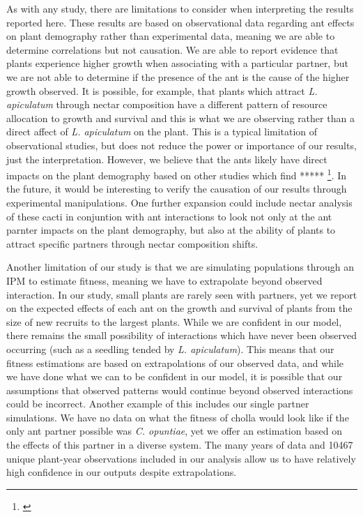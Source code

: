 \documentclass[11pt]{article}
\newcommand{\ali}[2]{{\color{blue}{#1}}\footnote{\textit{\color{blue}{#2}}}}
\begin{document}
As with any study, there are limitations to consider when interpreting the results reported here.
These results are based on observational data regarding ant effects on plant demography rather than experimental data, meaning we are able to determine correlations but not causation.
We are able to report evidence that plants experience higher growth when associating with a particular partner, but we are not able to determine if the presence of the ant is the cause of the higher growth observed.
It is possible, for example, that plants which attract \textit{L. apiculatum} through nectar composition have a different pattern of resource allocation to growth and survival and this is what we are observing rather than a direct affect of \textit{L. apiculatum} on the plant.
This is a typical limitation of observational studies, but does not reduce the power or importance of our results, just the interpretation.
However, we believe that the ants likely have direct impacts on the plant demography based on other studies which find ***** \ali{}{Find causal studies to show that ants really do things.}.
In the future, it would be interesting to verify the causation of our results through experimental manipulations.
One further expansion could include nectar analysis of these cacti in conjuntion with ant interactions to look not only at the ant parnter impacts on the plant demography, but also at the ability of plants to attract specific partners through nectar composition shifts. 

Another limitation of our study is that we are simulating populations through an IPM to estimate fitness, meaning we have to extrapolate beyond observed interaction.
In our study, small plants are rarely seen with partners, yet we report on the expected effects of each ant on the growth and survival of plants from the size of new recruits to the largest plants. 
While we are confident in our model, there remains the small possibility of interactions which have never been observed occurring (such as a seedling tended by \textit{L. apiculatum}).
This means that our fitness estimations are based on extrapolations of our observed data, and while we have done what we can to be confident in our model, it is possible that our assumptions that observed patterns would continue beyond observed interactions could be incorrect.
Another example of this includes our single partner simulations.
We have no data on what the fitness of cholla would look like if the only ant partner possible was \textit{C. opuntiae}, yet we offer an estimation based on the effects of this partner in a diverse system.
The many years of data and 10467 unique plant-year observations included in our analysis allow us to have relatively high confidence in our outputs despite extrapolations.
\end{document}
